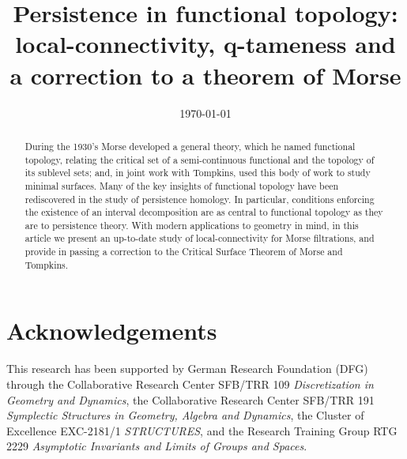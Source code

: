 \documentclass{amsart}
\theoremstyle{plain}
\theoremstyle{definition}
\begin{document}
\title[Persistence in functional topology]{Persistence in functional topology: local-connectivity, q-tameness and a correction to a theorem of Morse}
\author{}
\date{\today}

\begin{abstract}
	During the 1930's Morse developed a general theory, which he named functional topology, relating the critical set of a semi-continuous functional and the topology of its sublevel sets; and, in joint work with Tompkins, used this body of work to study minimal surfaces.
	Many of the key insights of functional topology have been rediscovered in the study of persistence homology.
	In particular, conditions enforcing the existence of an interval decomposition are as central to functional topology as they are to persistence theory.
	With modern applications to geometry in mind, in this article we present an up-to-date study of local-connectivity for Morse filtrations, and provide in passing a correction to the Critical Surface Theorem of Morse and Tompkins.
\end{abstract}


\maketitle
\tableofcontents




%

%

\section*{Acknowledgements}
This research has been supported by German Research Foundation (DFG) through the Collaborative Research Center SFB/TRR 109 \emph{Discretization in Geometry and Dynamics}, the Collaborative Research Center SFB/TRR 191 \emph{Symplectic Structures in Geometry, Algebra and Dynamics}, the Cluster of Excellence EXC-2181/1 \emph{STRUCTURES}, and the Research Training Group RTG 2229 \emph{Asymptotic Invariants and Limits of Groups and Spaces}.




\todos
\end{document}
